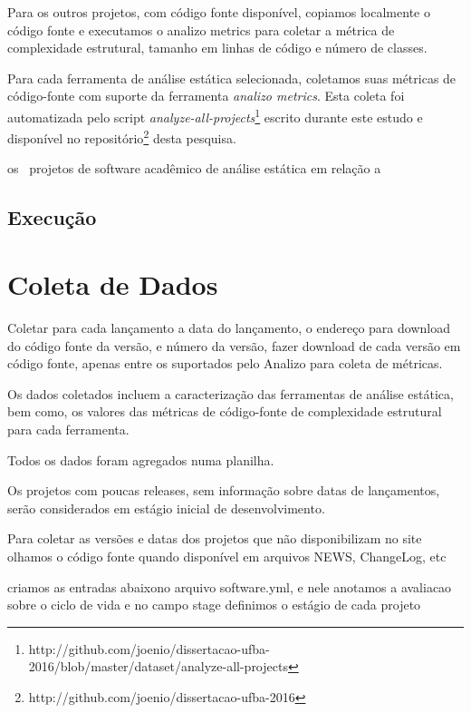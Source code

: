 Para os outros projetos, com código fonte disponível, copiamos localmente o código fonte
e executamos o analizo metrics para coletar a métrica de complexidade estrutural, tamanho em
linhas de código e número de classes.

Para cada ferramenta de análise estática selecionada, coletamos  suas métricas de código-fonte
com suporte da ferramenta {\it analizo metrics}. 
Esta coleta foi automatizada pelo script {\it
analyze-all-projects}\footnote{http://github.com/joenio/dissertacao-ufba-2016/blob/master/dataset/analyze-all-projects}
escrito durante este estudo e  disponível no
repositório\footnote{http://github.com/joenio/dissertacao-ufba-2016} desta
pesquisa.

os \SoftwareCount \ projetos de software acadêmico de análise estática
em relação a 

\subsection{Execução}

\section{Coleta de Dados} \label{estudo3:coleta}

Coletar para cada lançamento a data do lançamento, o endereço para download
do código fonte da versão, e número da versão, fazer download de cada versão
em código fonte, apenas entre os suportados pelo Analizo para coleta de métricas.

Os dados coletados incluem a caracterização das ferramentas de análise
estática, bem como, os valores das métricas de código-fonte de complexidade
estrutural para cada ferramenta.

Todos os dados foram agregados numa planilha.

Os projetos com poucas releases, sem informação sobre datas de lançamentos, serão
considerados em estágio inicial de desenvolvimento.

Para coletar as versões e datas dos projetos que não disponibilizam no site olhamos
o código fonte quando disponível em arquivos NEWS, ChangeLog, etc

criamos as entradas abaixono arquivo software.yml, e nele anotamos
a avaliacao sobre o ciclo de vida e no campo stage definimos o estágio
de cada projeto


